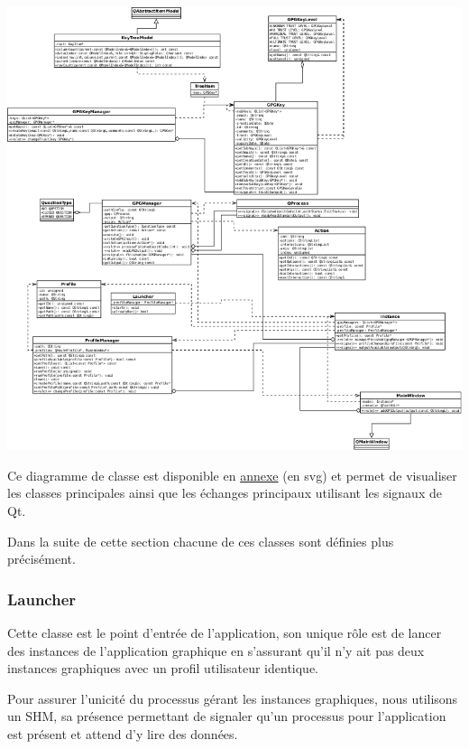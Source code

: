 \documentclass{../res/univ-projet}
\begin{document}
    \begin{center}
    \includegraphics[scale=.5]{graphics/diagramme-classes.png}
    
    Ce diagramme de classe est disponible en \href{graphics/diagramme-classes.svg}{annexe} (en svg)
    et permet de visualiser les classes principales ainsi que les échanges principaux utilisant
    les signaux de Qt.
    \end{center}

      Dans la suite de cette section chacune de ces classes sont définies plus précisément.

      \subsubsection{Launcher}

        Cette classe est le point d'entrée de l'application, son unique rôle est de lancer des instances de l'application
        graphique en s'assurant qu'il n'y ait pas deux instances graphiques avec un profil utilisateur
        identique.
        
        Pour assurer l'unicité du processus gérant les instances graphiques, nous utilisons un SHM,
        sa présence permettant de signaler qu'un processus pour l'application est présent et attend
        d'y lire des données.
        
\end{document}
